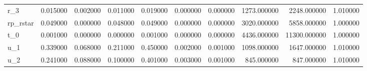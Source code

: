 \begin{tabular}{lrrrrrrrrr}
r_3 & 0.015000 & 0.002000 & 0.011000 & 0.019000 & 0.000000 & 0.000000 & 1273.000000 & 2248.000000 & 1.010000 \\
rp_rstar & 0.049000 & 0.000000 & 0.048000 & 0.049000 & 0.000000 & 0.000000 & 3020.000000 & 5858.000000 & 1.000000 \\
t_0 & 0.001000 & 0.000000 & 0.000000 & 0.001000 & 0.000000 & 0.000000 & 4436.000000 & 11300.000000 & 1.000000 \\
u_1 & 0.339000 & 0.068000 & 0.211000 & 0.450000 & 0.002000 & 0.001000 & 1098.000000 & 1647.000000 & 1.010000 \\
u_2 & 0.241000 & 0.088000 & 0.100000 & 0.401000 & 0.003000 & 0.001000 & 845.000000 & 847.000000 & 1.010000 \\
\bottomrule
\end{tabular}
